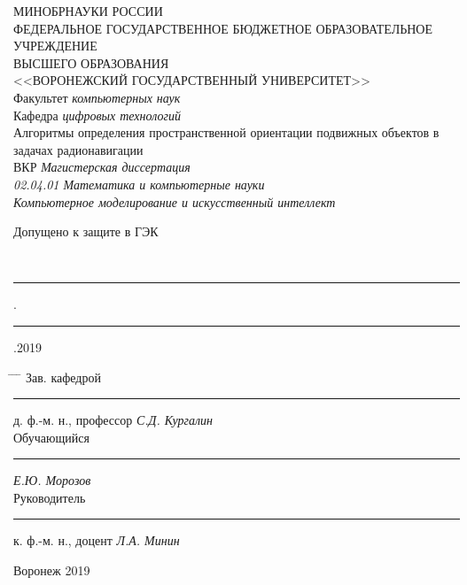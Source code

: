\documentclass[../main.tex]{subfiles}
\begin{document}
\thispagestyle{empty}
\begin{spacing}{1.0}
{
\center
{МИНОБРНАУКИ РОССИИ}\\
{ФЕДЕРАЛЬНОЕ ГОСУДАРСТВЕННОЕ БЮДЖЕТНОЕ ОБРАЗОВАТЕЛЬНОЕ}\\
{УЧРЕЖДЕНИЕ}\\
{ВЫСШЕГО ОБРАЗОВАНИЯ}\\
{<<ВОРОНЕЖСКИЙ ГОСУДАРСТВЕННЫЙ УНИВЕРСИТЕТ>>}\\

\vspace{13mm}
{\setlength{\parskip}{0pt}Факультет \textit{компьютерных наук}}\\
\vspace{3mm}
{\setlength{\parskip}{0pt}Кафедра \textit{цифровых технологий}}\\

\vspace{32mm}
{Алгоритмы определения пространственной ориентации подвижных объектов в задачах радионавигации}\\

\vspace{5mm}
{{ВКР} \textit{Магистерская диссертация}}\\
{\setlength{\parskip}{6pt}\textit{02.04.01 Математика и компьютерные науки}}\\
{\setlength{\parskip}{6pt}\textit{Компьютерное моделирование и искусственный интеллект}}\\

\vspace{20mm}
\begin{flushleft}
{Допущено к защите в ГЭК}{\ \ \rule[0mm]{5mm}{0,3mm}.\rule[0mm]{5mm}{0,3mm}.2019}
\end{flushleft}
\vspace{3mm}
\begin{tabbing}
\hspace*{4cm}\=\hspace*{4cm} \= \hspace*{5cm} \= \kill
Зав. кафедрой\> \rule[0mm]{3.7cm}{0,3mm} \> {д. ф.-м. н., профессор} \> \textit{С.Д. Кургалин} \\[8mm]
Обучающийся \> \rule[0mm]{3.7cm}{0,3mm} \> \> \textit{Е.Ю. Морозов} \\[8mm]
Руководитель \> \rule[0mm]{3.7cm}{0,3mm} \> {к. ф.-м. н., доцент} \> \textit{Л.А. Минин}
\end{tabbing}

\vspace{30mm}

\centerline{Воронеж 2019}
}
\end{spacing}
\clearpage
\end{document}
